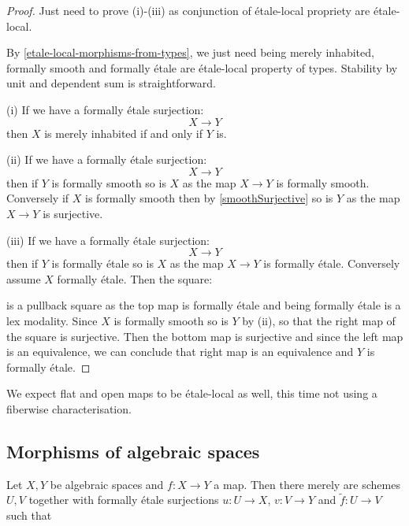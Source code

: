 \begin{proof}
Just need to prove (i)-(iii) as conjunction of étale-local propriety are étale-local.

By \cref{etale-local-morphisms-from-types}, we just need being merely inhabited, formally smooth and formally étale are étale-local property of types. Stability by unit and dependent sum is straightforward.

(i) If we have a formally étale surjection: 
\[X\to Y\]
then $X$ is merely inhabited if and only if $Y$ is.

(ii) If we have a formally étale surjection: 
\[X\to Y\]
then if $Y$ is formally smooth so is $X$ as the map $X\to Y$ is formally smooth. Conversely if $X$ is formally smooth then by \cref{smoothSurjective} so is $Y$ as the map $X\to Y$ is surjective.

(iii) If we have a formally étale surjection: 
\[X\to Y\]
then if $Y$ is formally étale so is $X$ as the map $X\to Y$ is formally étale. Conversely assume $X$ formally étale. Then the square:
    \begin{center}
  \end{center}
  is a pullback square as the top map is formally étale and being formally étale is a lex modality. Since $X$ is formally smooth so is $Y$ by (ii), so that the right map of the square is surjective. Then the bottom map is surjective and since the left map is an equivalence, we can conclude that right map is an equivalence and $Y$ is formally étale.
\end{proof}

\begin{remark}
We expect flat and open maps to be étale-local as well, this time not using a fiberwise characterisation.
\end{remark}


\subsection{Morphisms of algebraic spaces}

\begin{lemma}
  Let $X,Y$ be algebraic spaces and $f:X\to Y$ a map.
  Then there merely are schemes $U,V$ together with formally étale surjections
  $u:U\to X$, $v:V\to Y$ and $\widetilde{f}:U\to V$ such that
  \begin{center}
  \end{center}
\end{lemma}

